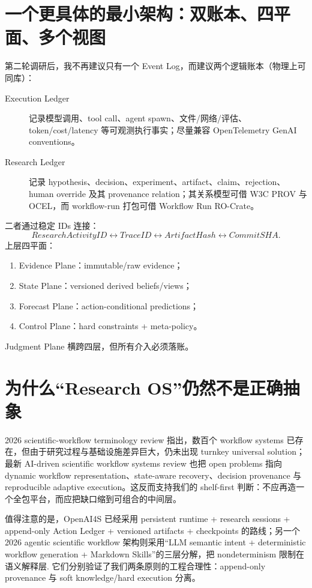 \documentclass[11pt,a4paper]{ctexart}
\begin{document}
\section{一个更具体的最小架构：双账本、四平面、多个视图}

第二轮调研后，我不再建议只有一个 Event Log，而建议两个逻辑账本（物理上可同库）：
\begin{description}
 \item[Execution Ledger] 记录模型调用、tool call、agent spawn、文件/网络/评估、token/cost/latency 等可观测执行事实；尽量兼容 OpenTelemetry GenAI conventions\cite{otel2026genai}。
 \item[Research Ledger] 记录 hypothesis、decision、experiment、artifact、claim、rejection、human override 及其 provenance relation；其关系模型可借 W3C PROV 与 OCEL，而 workflow-run 打包可借 Workflow Run RO-Crate\cite{w3cprov2013,ocel2023,soiland2024wfrun}。
\end{description}
二者通过稳定 IDs 连接：
\begin{equation}
ResearchActivityID\leftrightarrow TraceID\leftrightarrow ArtifactHash\leftrightarrow CommitSHA.
\end{equation}
上层四平面：
\begin{enumerate}
 \item Evidence Plane：immutable/raw evidence；
 \item State Plane：versioned derived beliefs/views；
 \item Forecast Plane：action-conditional predictions；
 \item Control Plane：hard constraints + meta-policy。
\end{enumerate}
Judgment Plane 横跨四层，但所有介入必须落账。

\section{为什么“Research OS”仍然不是正确抽象}

2026 scientific-workflow terminology review 指出，数百个 workflow systems 已存在，但由于研究过程与基础设施差异巨大，仍未出现 turnkey universal solution\cite{workflowterms2026}；最新 AI-driven scientific workflow systems review 也把 open problems 指向 dynamic workflow representation、state-aware recovery、decision provenance 与 reproducible adaptive execution\cite{alnasir2026workflows}。这反而支持我们的 shelf-first 判断：不应再造一个全包平台，而应把缺口缩到可组合的中间层。

值得注意的是，OpenAI4S 已经采用 persistent runtime + research sessions + append-only Action Ledger + versioned artifacts + checkpoints 的路线\cite{openai4s2026}；另一个 2026 agentic scientific workflow 架构则采用“LLM semantic intent + deterministic workflow generation + Markdown Skills”的三层分解，把 nondeterminism 限制在语义解释层\cite{balis2026workflow}. 它们分别验证了我们两条原则的工程合理性：append-only provenance 与 soft knowledge/hard execution 分离。
\end{document}

